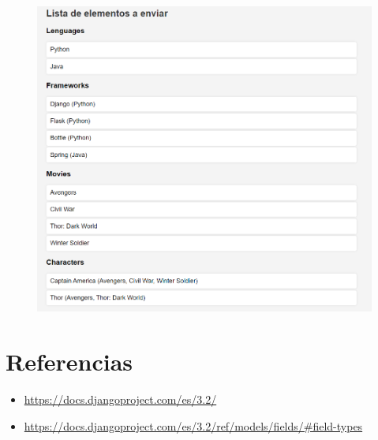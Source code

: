 \documentclass{article}
\begin{document}
	\begin{figure}[H]
		\centering
		\includegraphics[width=1.0\textwidth,keepaspectratio]{img/C7.png}
	\end{figure}	
\clearpage
\section{Referencias}
\begin{itemize}			
	\item \url{https://docs.djangoproject.com/es/3.2/}
	\item\url{https://docs.djangoproject.com/es/3.2/ref/models/fields/#field-types}
\end{itemize}	
	
%
%
%
			
\end{document}
